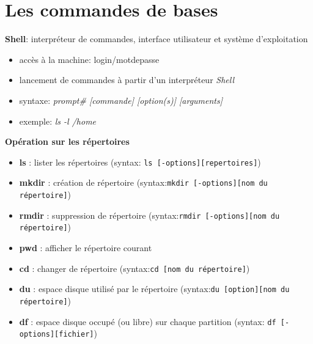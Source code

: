 \documentclass[french]{beamer}
\begin{document}
\section{Les commandes de bases} 
\frame{\tableofcontents[current]}

\begin{frame}
\textbf{Shell}: interpréteur de commandes, interface utilisateur et système
d'exploitation
    \begin{itemize}
    \item accès à la machine: login/motdepasse 
    \item lancement de commandes à partir d'un interpréteur \textit{Shell}
    \item syntaxe: \textit{prompt\# [commande] [option(s)] [arguments]}
    \item exemple: \textit{ls -l /home}
    \end{itemize}
\end{frame}

\begin{frame}
\textbf{Opération sur les répertoires}
    \begin{itemize}
    \item \textbf{ls} : lister les répertoires (syntax: \texttt{ls [-options][repertoires]})
    \item \textbf{mkdir} : création de répertoire (syntax:\texttt{mkdir [-options][nom du répertoire]})
    \item \textbf{rmdir} : suppression de répertoire (syntax:\texttt{rmdir [-options][nom du répertoire]})
    \item \textbf{pwd} : afficher le répertoire courant
    \item \textbf{cd} : changer de répertoire (syntax:\texttt{cd [nom du répertoire]})
    \item \textbf{du} : espace disque utilisé par le répertoire (syntax:\texttt{du [option][nom du répertoire]})
    \item \textbf{df} : espace disque occupé (ou libre) sur chaque partition (syntax: \texttt{df [-options][fichier]})
    \end{itemize}
\end{frame}
\end{document}
